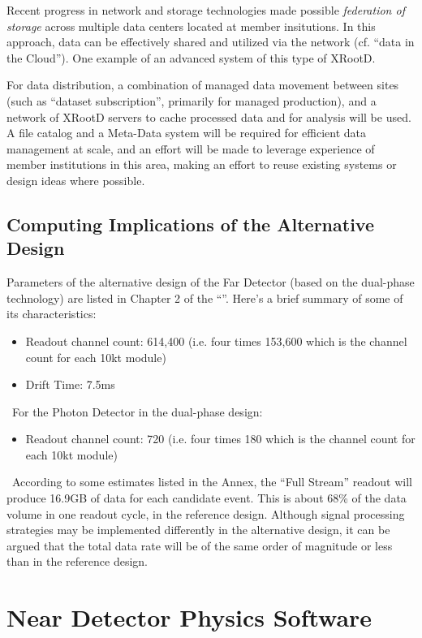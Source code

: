 Recent progress in network and storage technologies made possible \textit{federation of storage} across multiple data centers located at
member insitutions. In this approach, data can be effectively shared and utilized via the network (cf. ``data in the Cloud''). One example of
an advanced system of this type of XRootD.

For data distribution, a combination of managed data movement between sites (such as ``dataset subscription'',
primarily for managed production), and a network of XRootD servers to cache processed data and for analysis will be used.
A file catalog and a Meta-Data system will be required for efficient data management at scale, and an effort will be made to leverage experience of
member institutions in this area, making an effort to reuse existing systems or design ideas where possible.

\subsection{Computing Implications of the Alternative Design}
\label{sec:detectors-sc-alternate}
Parameters of the alternative design of the Far Detector (based on the dual-phase technology)
are listed in Chapter 2 of the ``\anxrates''. Here's a brief summary of some of its characteristics:

\begin{itemize}
	\item Readout channel count: 614,400 (i.e. four times 153,600 which is the channel count
	for each 10kt module)
	\item Drift Time: 7.5ms
\end{itemize}
\
For the Photon Detector in the dual-phase design:
\begin{itemize}
	\item Readout channel count: 720 (i.e. four times 180 which is the channel count
	for each 10kt module)
\end{itemize}
\
According to some estimates listed in the Annex, the ``Full Stream'' readout will produce 16.9GB of data for
each candidate event. This is about 68\% of the data volume in one readout cycle, in the reference design.
Although signal processing strategies may be implemented differently in the alternative design, it can be argued
that the total data rate will be of the same order of magnitude or less than in the reference design.

\section{Near Detector Physics Software}
\label{sec:detectors-sc-nd-physics-software}

